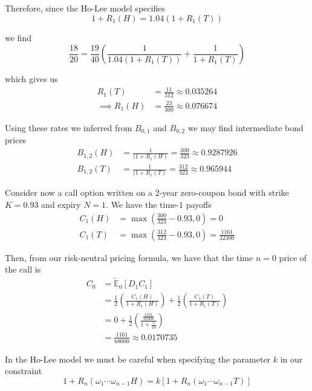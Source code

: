 \documentclass[12pt]{article}
\newlength\tindent
\renewcommand{\indent}{\hspace*{\tindent}}
\newcommand{\E}{\mathbb E}
\begin{document}
Therefore, since the Ho-Lee model specifies
\begin{equation*}
	1 + R_1(H) = 1.04(1 + R_1(T))
\end{equation*}

we find
\begin{equation*}
	\frac{18}{20} = \frac{19}{40} \left( \frac{1}{ 1.04 (1 + R_1(T)) } + \frac{1}{1 + R_1(T)} \right)
\end{equation*}

which gives us 
\begin{align*}
	R_1(T) &= \frac{11}{312} \approx 0.035264 \\
	\implies R_1(H) &= \frac{23}{300} \approx 0.076674
\end{align*}

Using these rates we inferred from $B_{0,1}$ and $B_{0,2}$ we may find intermediate bond prices
\begin{align*}
	B_{1,2}(H) &= \frac{1}{(1 + R_1(H)} = \frac{300}{323} \approx 0.9287926 \\
	B_{1,2}(T) &= \frac{1}{(1 + R_1(T)} = \frac{312}{323} \approx 0.965944
\end{align*}

\indent Consider now a call option written on a 2-year zero-coupon bond with strike $K = 0.93$ and expiry $N = 1$. We have the time-$1$ payoffs
\begin{align*}
	C_1(H) &= \max \left( \frac{300}{323} - 0.93, 0 \right) = 0 \\
	C_1(T) &= \max \left( \frac{312}{323} - 0.93, 0 \right) = \frac{1161}{32300}
\end{align*}

Then, from our risk-neutral pricing formula, we have that the time $n = 0$ price of the call is
\begin{align*}
	C_0 &= \tilde{\E}_0 \left[ D_1C_1 \right] \\
	&= \frac{1}{2} \left( \frac{ C_1(H) }{ 1 + R_1(H) } \right) + \frac{1}{2} \left( \frac{ C_1(T) }{ 1 + R_1(T) } \right) \\
	&= 0 + \frac{1}{2} \left( \frac{ \frac{1161}{32300} }{ 1 + \frac{1}{19} } \right) \\
	&= \frac{1161}{68000} \approx 0.0170735
\end{align*} \hfill

In the Ho-Lee model we must be careful when specifying the parameter $k$ in our constraint
\begin{equation*}
	1 + R_n(\omega_1\cdots\omega_{n - 1}H) = k[1 + R_n(\omega_1\cdots\omega_{n - 1}T)]
\end{equation*}
\end{document}

